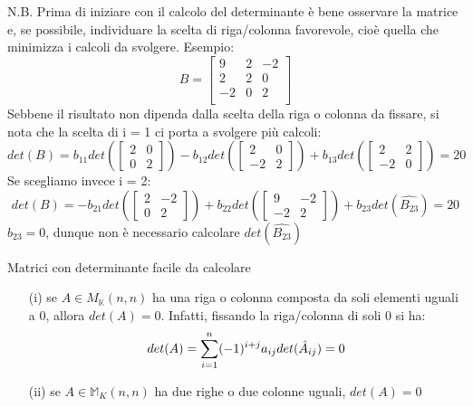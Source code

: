 \documentclass[a4paper, 12pt]{article}
\theoremstyle{definition}
\begin{document}
\noindent N.B. Prima di iniziare con il calcolo del determinante è bene osservare la matrice e, se possibile, individuare la scelta di riga/colonna favorevole, cioè quella che minimizza i calcoli da svolgere. \break
Esempio:
\[
    B = \begin{bmatrix}
        9 & 2 & -2 \\
        2 & 2 & 0 \\
        -2 & 0 & 2 \\
    \end{bmatrix}
\]
Sebbene il risultato non dipenda dalla scelta della riga o colonna da fissare, si nota che la scelta di i = 1 ci porta a svolgere più calcoli:
\[ 
    det(B) = b_{11}det(\begin{bmatrix} 2 & 0 \\ 0 & 2 \end{bmatrix}) - b_{12}det(\begin{bmatrix} 2 & 0 \\ -2 & 2 \end{bmatrix}) + b_{13}det(\begin{bmatrix} 2 & 2 \\ -2 & 0 \end{bmatrix}) = 20
\]
Se scegliamo invece i = 2:
\[ 
    det(B) = -b_{21}det(\begin{bmatrix} 2 & -2 \\ 0 & 2 \end{bmatrix}) + b_{22}det(\begin{bmatrix} 9 & -2 \\ -2 & 2 \end{bmatrix}) + b_{23}det(\hat{B_{23}}) = 20
\]
$b_{23} = 0$, dunque non è necessario calcolare $det(\hat{B_{23}})$

\vspace{1cm}
\begin{center}
    Matrici con determinante facile da calcolare
\end{center}
\begin{itemize}
    \item [(i)] se $A \in M_\mathds{K}(n,n)$ ha una riga o colonna composta da soli elementi uguali a 0, allora $det(A) = 0$. \smallbreak
    Infatti, fissando la riga/colonna di soli 0 si ha:
    \[ 
        det(A) = \sum_{i = 1}^{n}(-1)^{i+j}a_{ij}det(\Hat{A}_{ij}) = 0
    \]
    \item [(ii)] se $A \in \mathds{M}_K(n,n)$  ha due righe o due colonne uguali, $det(A) = 0$
\end{itemize}
\end{document}
